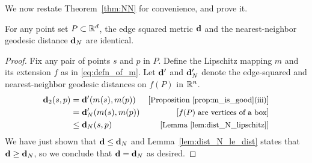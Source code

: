   We now restate Theorem~\ref{thm:NN} for convenience, and prove
  it.
  \begin{theorem}\label{thm:equality}
    For any point set $P\subset\mathbb{R}^d$, the edge squared metric $\mathbf{d}$ and the nearest-neighbor geodesic distance $\mathbf{d}_N$ are identical.
  \end{theorem}
  \begin{proof}
    Fix any pair of points $s$ and $p$ in $P$.
    Define the Lipschitz mapping $m$ and its extension $f$ as in \eqref{eq:defn_of_m}.
    Let $\mathbf{d}'$ and $\mathbf{d}_N'$ denote the edge-squared and nearest-neighbor geodesic distances on $f(P)$ in $\mathbb{R}^n$.
    \begin{align*}
      \mathbf{d}_2(s,p) 
        &= \mathbf{d}'(m(s), m(p)) &\left[\text{\small{Proposition~\ref{prop:m_is_good}(iii)}}\right]\\
        &= \mathbf{d}_N'(m(s), m(p)) &\left[\text{\small{$f(P)$ are vertices of a box}}\right]\\
        &\le \mathbf{d}_N(s, p) &\left[\text{\small{Lemma~\ref{lem:dist_N_lipschitz}}}\right]
    \end{align*}
    We have just shown that $\mathbf{d}\le \mathbf{d}_N$ and Lemma~\ref{lem:dist_N_le_dist} states that $\mathbf{d}\ge \mathbf{d}_N$, so we conclude that $\mathbf{d} = \mathbf{d}_N$ as desired.
  \end{proof}

